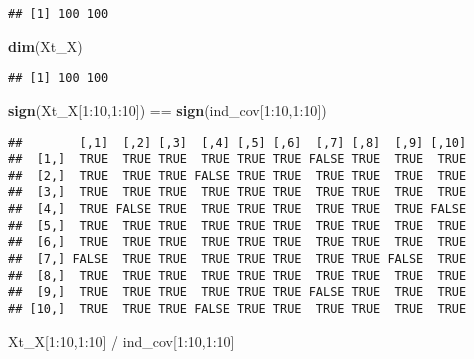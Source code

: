 \documentclass[]{article}
\newenvironment{Shaded}{\begin{snugshade}}{\end{snugshade}}
\newcommand{\KeywordTok}[1]{\textcolor[rgb]{0.13,0.29,0.53}{\textbf{{#1}}}}
\newcommand{\DecValTok}[1]{\textcolor[rgb]{0.00,0.00,0.81}{{#1}}}
\newcommand{\StringTok}[1]{\textcolor[rgb]{0.31,0.60,0.02}{{#1}}}
\newcommand{\NormalTok}[1]{{#1}}
\begin{document}
\begin{verbatim}
## [1] 100 100
\end{verbatim}

\begin{Shaded}
\begin{Highlighting}[]
\KeywordTok{dim}\NormalTok{(Xt_X)}
\end{Highlighting}
\end{Shaded}

\begin{verbatim}
## [1] 100 100
\end{verbatim}

\begin{Shaded}
\begin{Highlighting}[]
\KeywordTok{sign}\NormalTok{(Xt_X[}\DecValTok{1}\NormalTok{:}\DecValTok{10}\NormalTok{,}\DecValTok{1}\NormalTok{:}\DecValTok{10}\NormalTok{]) ==}\StringTok{ }\KeywordTok{sign}\NormalTok{(ind_cov[}\DecValTok{1}\NormalTok{:}\DecValTok{10}\NormalTok{,}\DecValTok{1}\NormalTok{:}\DecValTok{10}\NormalTok{])}
\end{Highlighting}
\end{Shaded}

\begin{verbatim}
##        [,1]  [,2] [,3]  [,4] [,5] [,6]  [,7] [,8]  [,9] [,10]
##  [1,]  TRUE  TRUE TRUE  TRUE TRUE TRUE FALSE TRUE  TRUE  TRUE
##  [2,]  TRUE  TRUE TRUE FALSE TRUE TRUE  TRUE TRUE  TRUE  TRUE
##  [3,]  TRUE  TRUE TRUE  TRUE TRUE TRUE  TRUE TRUE  TRUE  TRUE
##  [4,]  TRUE FALSE TRUE  TRUE TRUE TRUE  TRUE TRUE  TRUE FALSE
##  [5,]  TRUE  TRUE TRUE  TRUE TRUE TRUE  TRUE TRUE  TRUE  TRUE
##  [6,]  TRUE  TRUE TRUE  TRUE TRUE TRUE  TRUE TRUE  TRUE  TRUE
##  [7,] FALSE  TRUE TRUE  TRUE TRUE TRUE  TRUE TRUE FALSE  TRUE
##  [8,]  TRUE  TRUE TRUE  TRUE TRUE TRUE  TRUE TRUE  TRUE  TRUE
##  [9,]  TRUE  TRUE TRUE  TRUE TRUE TRUE FALSE TRUE  TRUE  TRUE
## [10,]  TRUE  TRUE TRUE FALSE TRUE TRUE  TRUE TRUE  TRUE  TRUE
\end{verbatim}

\begin{Shaded}
\begin{Highlighting}[]
\NormalTok{Xt_X[}\DecValTok{1}\NormalTok{:}\DecValTok{10}\NormalTok{,}\DecValTok{1}\NormalTok{:}\DecValTok{10}\NormalTok{] /}\StringTok{ }\NormalTok{ind_cov[}\DecValTok{1}\NormalTok{:}\DecValTok{10}\NormalTok{,}\DecValTok{1}\NormalTok{:}\DecValTok{10}\NormalTok{]}
\end{Highlighting}
\end{Shaded}
\end{document}
